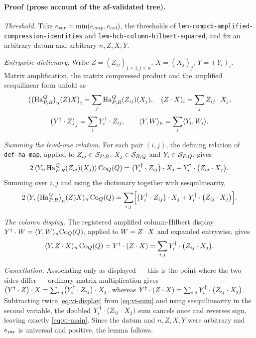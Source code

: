 \paragraph{Proof (prose account of the af-validated tree).}
\emph{Threshold.} Take
$e_{\mathrm{var}}=\min(e_{\mathrm{cmp}},e_{\mathrm{col}})$, the thresholds of
\texttt{lem-compcb-amplified-compression-identities} and
\texttt{lem-hcb-column-hilbert-squared}, and fix an arbitrary datum and arbitrary
$n,Z,X,Y$.

\emph{Entrywise dictionary.} Write $Z=(Z_{ij})_{1\le i,j\le n}$, $X=(X_j)_j$,
$Y=(Y_i)_i$. Matrix amplification, the matrix compressed product and the amplified
sesquilinear form unfold as
\[
  \bigl(\bigl(\mathrm{Ha}^{Q}_{P,R}\bigr)_{n}(Z)X\bigr)_i=\sum_j\mathrm{Ha}^{Q}_{P,R}(Z_{ij})(X_j),
  \quad
  (Z\mathbin{\cdot} X)_i=\sum_jZ_{ij}\mathbin{\cdot} X_j,
\]
\[
  \bigl(Y^{\dagger}\mathbin{\cdot} Z\bigr)_j=\sum_iY_i^{\dagger}\mathbin{\cdot} Z_{ij},
  \qquad
  \langle Y,W\rangle_{n}=\sum_i\langle Y_i,W_i\rangle.
\]

\emph{Summing the level-one relation.} For each pair $(i,j)$, the defining relation of
\texttt{def-ha-map}, applied to $Z_{ij}\in\mathcal S_{P,R}$, $X_j\in\mathcal S_{R,Q}$ and
$Y_i\in\mathcal S_{P,Q}$, gives
\[
  2\,\langle Y_i,\mathrm{Ha}^{Q}_{P,R}(Z_{ij})(X_j)\rangle\,\mathrm{Co}_{Q}(Q)
  =\bigl(Y_i^{\dagger}\mathbin{\cdot} Z_{ij}\bigr)\mathbin{\cdot} X_j+Y_i^{\dagger}\mathbin{\cdot}\bigl(Z_{ij}\mathbin{\cdot} X_j\bigr).
\]
Summing over $i,j$ and using the dictionary together with sesquilinearity,
\begin{equation}\label{eq:vi-sum}
  2\,\langle Y,\bigl(\mathrm{Ha}^{Q}_{P,R}\bigr)_{n}(Z)X\rangle_{n}\,\mathrm{Co}_{Q}(Q)
  =\sum_{i,j}\Bigl[\bigl(Y_i^{\dagger}\mathbin{\cdot} Z_{ij}\bigr)\mathbin{\cdot} X_j+Y_i^{\dagger}\mathbin{\cdot}\bigl(Z_{ij}\mathbin{\cdot} X_j\bigr)\Bigr].
\end{equation}

\emph{The column display.} The registered amplified column-Hilbert display
$Y^{\dagger}\mathbin{\cdot} W=\langle Y,W\rangle_{n}\mathrm{Co}_{Q}(Q)$, applied to $W=Z\mathbin{\cdot} X$ and expanded entrywise, gives
\begin{equation}\label{eq:vi-display}
  \langle Y,Z\mathbin{\cdot} X\rangle_{n}\,\mathrm{Co}_{Q}(Q)=Y^{\dagger}\mathbin{\cdot}(Z\mathbin{\cdot} X)=\sum_{i,j}Y_i^{\dagger}\mathbin{\cdot}\bigl(Z_{ij}\mathbin{\cdot} X_j\bigr).
\end{equation}

\emph{Cancellation.} Associating only as displayed --- this is the point where the two
sides differ --- ordinary matrix multiplication gives
$\bigl(Y^{\dagger}\mathbin{\cdot} Z\bigr)\mathbin{\cdot} X=\sum_{i,j}\bigl(Y_i^{\dagger}\mathbin{\cdot} Z_{ij}\bigr)\mathbin{\cdot} X_j$, whereas
$Y^{\dagger}\mathbin{\cdot}(Z\mathbin{\cdot} X)=\sum_{i,j}Y_i^{\dagger}\mathbin{\cdot}\bigl(Z_{ij}\mathbin{\cdot} X_j\bigr)$. Subtracting twice
\eqref{eq:vi-display} from \eqref{eq:vi-sum} and using sesquilinearity in the second
variable, the doubled $Y_i^{\dagger}\mathbin{\cdot}(Z_{ij}\mathbin{\cdot} X_j)$ sum cancels once and reverses sign,
leaving exactly \eqref{eq:vi-main}. Since the datum and $n,Z,X,Y$ were arbitrary and
$e_{\mathrm{var}}$ is universal and positive, the lemma follows.

